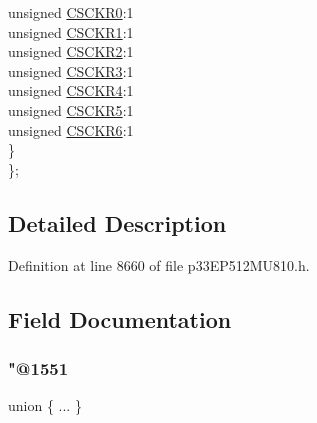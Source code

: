 \begin{DoxyCompactItemize}
\begin{tabbing}
\>\>unsigned \hyperlink{structtag_r_p_i_n_r24_b_i_t_s_a5b4f31e294ae6bc398f90dc618c4236a}{CSCKR0}:1\\
\>\>unsigned \hyperlink{structtag_r_p_i_n_r24_b_i_t_s_ab60825ee5bba6f60afe3d1294b5837ac}{CSCKR1}:1\\
\>\>unsigned \hyperlink{structtag_r_p_i_n_r24_b_i_t_s_acf0aa03a3abaa4fbbcbb9f6cb799fec8}{CSCKR2}:1\\
\>\>unsigned \hyperlink{structtag_r_p_i_n_r24_b_i_t_s_a986c9859bdecf05b2f40043481109ef6}{CSCKR3}:1\\
\>\>unsigned \hyperlink{structtag_r_p_i_n_r24_b_i_t_s_a6a3f7d0a1ad021e4d1039348a64bba6c}{CSCKR4}:1\\
\>\>unsigned \hyperlink{structtag_r_p_i_n_r24_b_i_t_s_ac35b59464651c4d315ad00bfca7a8630}{CSCKR5}:1\\
\>\>unsigned \hyperlink{structtag_r_p_i_n_r24_b_i_t_s_ae4f98242128187297d4e71679fad6672}{CSCKR6}:1\\
\>\} \\
\}; \\

\end{tabbing}\end{DoxyCompactItemize}


\subsection{Detailed Description}


Definition at line 8660 of file p33\+E\+P512\+M\+U810.\+h.



\subsection{Field Documentation}
\mbox{\label{structtag_r_p_i_n_r24_b_i_t_s_a4129625e8eb47c23dfe6a5602ff34d05}} 
\subsubsection{\texorpdfstring{"@1551}{@1551}}
{\footnotesize\ttfamily union \{ ... \} }

\mbox{\label{structtag_r_p_i_n_r24_b_i_t_s_adf71f3d8410c1f1dbbc96680a92c49af}} 
